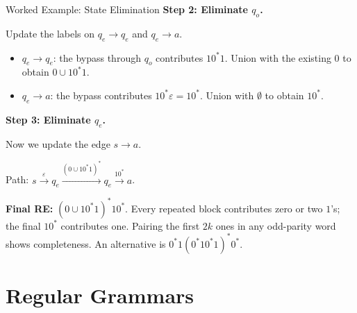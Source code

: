 \documentclass[10pt]{beamer}
\begin{document}
\begin{frame}{Worked Example: State Elimination}
  \small
  \textbf{Step 2: Eliminate $q_o$.} 
  
  Update the labels on
  $q_e\rightarrow q_e$ and $q_e\rightarrow a$.
  \begin{itemize}
    \item $q_e\rightarrow q_e$: the bypass through $q_o$ contributes
      $10^*1$. Union with the existing $0$ to obtain $0\cup10^*1$.
    \item $q_e\rightarrow a$: the bypass contributes
      $10^*\varepsilon=10^*$. Union with $\emptyset$ to obtain $10^*$.
  \end{itemize}
  \pause
  \begin{center}
  \end{center}
  \pause
  \textbf{Step 3: Eliminate $q_e$.}
  
  Now we update the edge $s \rightarrow a$.
  
  Path: $s \xrightarrow{\varepsilon} q_e
  \xrightarrow{(0 \cup 10^*1)^{*}} q_e \xrightarrow{10^*} a$.

  \vspace{0.2cm}
  \textbf{Final RE:} $(0 \cup 10^*1)^{*}10^*$.
  Every repeated block contributes zero or two $1$'s; the final $10^*$
  contributes one. Pairing the first $2k$ ones in any odd-parity word shows
  completeness. An alternative is $0^*1(0^*10^*1)^*0^*$.
\end{frame}

\section{Regular Grammars}
\end{document}
